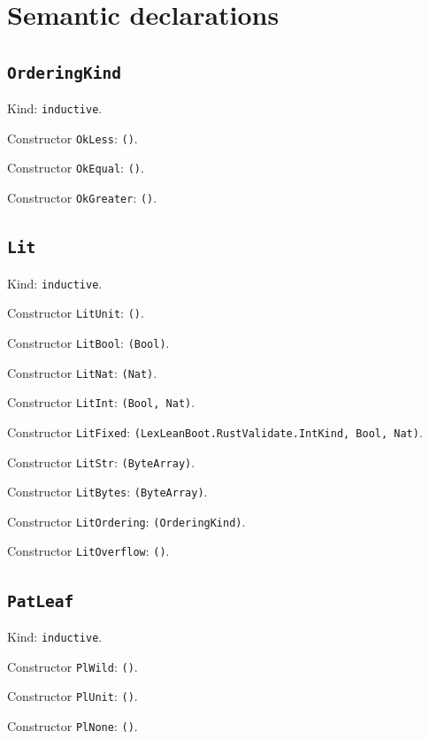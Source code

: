 \documentclass[11pt]{article}
\begin{document}
\section*{Semantic declarations}
\subsection*{\texttt{OrderingKind}}
\noindent Kind: \texttt{inductive}.\par
\noindent Constructor \texttt{OkLess}: \texttt{()}.\par
\noindent Constructor \texttt{OkEqual}: \texttt{()}.\par
\noindent Constructor \texttt{OkGreater}: \texttt{()}.\par
\subsection*{\texttt{Lit}}
\noindent Kind: \texttt{inductive}.\par
\noindent Constructor \texttt{LitUnit}: \texttt{()}.\par
\noindent Constructor \texttt{LitBool}: \texttt{(Bool)}.\par
\noindent Constructor \texttt{LitNat}: \texttt{(Nat)}.\par
\noindent Constructor \texttt{LitInt}: \texttt{(Bool, Nat)}.\par
\noindent Constructor \texttt{LitFixed}: \texttt{(LexLeanBoot.RustValidate.IntKind, Bool, Nat)}.\par
\noindent Constructor \texttt{LitStr}: \texttt{(ByteArray)}.\par
\noindent Constructor \texttt{LitBytes}: \texttt{(ByteArray)}.\par
\noindent Constructor \texttt{LitOrdering}: \texttt{(OrderingKind)}.\par
\noindent Constructor \texttt{LitOverflow}: \texttt{()}.\par
\subsection*{\texttt{PatLeaf}}
\noindent Kind: \texttt{inductive}.\par
\noindent Constructor \texttt{PlWild}: \texttt{()}.\par
\noindent Constructor \texttt{PlUnit}: \texttt{()}.\par
\noindent Constructor \texttt{PlNone}: \texttt{()}.\par
\end{document}
